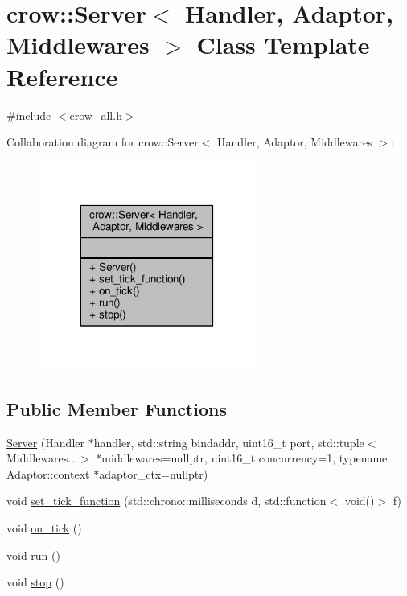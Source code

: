 \hypertarget{classcrow_1_1_server}{\section{crow\-:\-:Server$<$ Handler, Adaptor, Middlewares $>$ Class Template Reference}
\label{classcrow_1_1_server}
}


{\ttfamily \#include $<$crow\-\_\-all.\-h$>$}



Collaboration diagram for crow\-:\-:Server$<$ Handler, Adaptor, Middlewares $>$\-:
\nopagebreak
\begin{figure}[H]
\begin{center}
\leavevmode
\includegraphics[width=202pt]{classcrow_1_1_server__coll__graph}
\end{center}
\end{figure}
\subsection*{Public Member Functions}
\begin{DoxyCompactItemize}
\item 
\hyperlink{classcrow_1_1_server_a6f297dc21678925d2b78143f33cbb4f4}{Server} (Handler $\ast$handler, std\-::string bindaddr, uint16\-\_\-t port, std\-::tuple$<$ Middlewares...$>$ $\ast$middlewares=nullptr, uint16\-\_\-t concurrency=1, typename Adaptor\-::context $\ast$adaptor\-\_\-ctx=nullptr)
\item 
void \hyperlink{classcrow_1_1_server_abcd3d2395e5ca2a44fd58eacfbb1ed65}{set\-\_\-tick\-\_\-function} (std\-::chrono\-::milliseconds d, std\-::function$<$ void()$>$ f)
\item 
void \hyperlink{classcrow_1_1_server_a932e5790236d8f2dc4c973e357c6bd43}{on\-\_\-tick} ()
\item 
void \hyperlink{classcrow_1_1_server_a90b072e9143f9417ce9dd30510a07495}{run} ()
\item 
void \hyperlink{classcrow_1_1_server_aff2067a94286dd5a584a187cbce369f5}{stop} ()
\end{DoxyCompactItemize}


